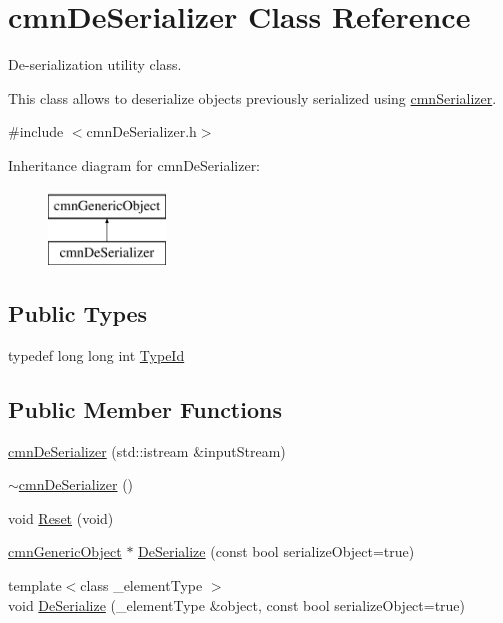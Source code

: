 \hypertarget{classcmn_de_serializer}{}\section{cmn\+De\+Serializer Class Reference}
\label{classcmn_de_serializer}


De-\/serialization utility class.

This class allows to deserialize objects previously serialized using \hyperlink{classcmn_serializer}{cmn\+Serializer}.  




{\ttfamily \#include $<$cmn\+De\+Serializer.\+h$>$}

Inheritance diagram for cmn\+De\+Serializer\+:\begin{figure}[H]
\begin{center}
\leavevmode
\includegraphics[height=2.000000cm]{d5/ddd/classcmn_de_serializer}
\end{center}
\end{figure}
\subsection*{Public Types}
\begin{DoxyCompactItemize}
\item 
typedef long long int \hyperlink{classcmn_de_serializer_aa4c89a09461da0a62a6cc4a29dfdd3c2}{Type\+Id}
\end{DoxyCompactItemize}
\subsection*{Public Member Functions}
\begin{DoxyCompactItemize}
\item 
\hyperlink{classcmn_de_serializer_adf60bd67f459b34a40ee529f4070a274}{cmn\+De\+Serializer} (std\+::istream \&input\+Stream)
\item 
\hyperlink{classcmn_de_serializer_aa4685fa9d34c83c5f2e9e115396b956f}{$\sim$cmn\+De\+Serializer} ()
\item 
void \hyperlink{classcmn_de_serializer_a601562de150fb39655137e1e7a12c1d1}{Reset} (void)
\item 
\hyperlink{classcmn_generic_object}{cmn\+Generic\+Object} $\ast$ \hyperlink{classcmn_de_serializer_a97972734ea443add8c55f1874c343bee}{De\+Serialize} (const bool serialize\+Object=true)
\item 
{\footnotesize template$<$class \+\_\+element\+Type $>$ }\\void \hyperlink{classcmn_de_serializer_a4be6c703211fbe1c6b9e890d733d7fa7}{De\+Serialize} (\+\_\+element\+Type \&object, const bool serialize\+Object=true)
\end{DoxyCompactItemize}


